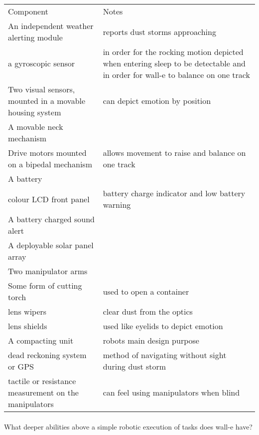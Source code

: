 \documentclass[11pt]{book}
\begin{document}
\begin{tabular}{|l|l|}
\hline
	Component & Notes\\
	An independent weather alerting module & reports dust storms approaching\\
	a gyroscopic sensor & in order for the rocking motion depicted when entering sleep to be detectable and in order for wall-e to balance on one track\\
	Two visual sensors, mounted in a movable housing system & can depict emotion by position\\
	A movable neck mechanism & \\
	Drive motors mounted on a bipedal mechanism & allows movement to raise and balance on one track\\
	A battery & \\
	colour LCD front panel & battery charge indicator and low battery warning\\
	A battery charged sound alert & \\
	A deployable solar panel array & \\
	Two manipulator arms & \\
	Some form of cutting torch & used to open a container\\
	lens wipers & clear dust from the optics\\
	lens shields & used like eyelids to depict emotion\\
	A compacting unit & robots main design purpose\\
	dead reckoning system or GPS & method of navigating without sight during dust storm\\
	tactile or resistance measurement on the manipulators & can feel using manipulators when blind \\
\hline
\end{tabular}

\paragraph{} What deeper abilities above a simple robotic execution of tasks does wall-e have?
\end{document}
